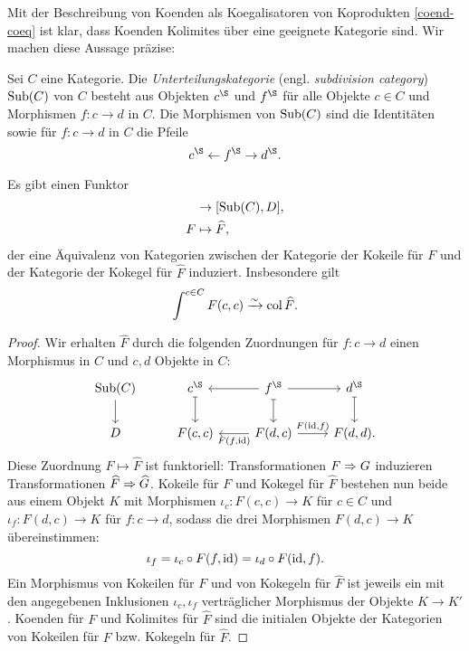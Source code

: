 Mit der Beschreibung von Koenden als Koegalisatoren von Koprodukten
\ref{coend-coeq} ist klar, dass Koenden Kolimites über eine geeignete
Kategorie sind. Wir machen diese Aussage präzise:
\begin{defn} \label{def:sub}
  Sei $C$ eine Kategorie. Die \emph{Unterteilungskategorie}
  (engl. \emph{subdivision category}) $\operatorname{Sub}(C)$ von $C$ besteht aus
  Objekten $c^\S$ und $f^\S$ für alle Objekte $c \in C$ und Morphismen
  $f: c \to d$ in $C$. Die Morphismen von $\operatorname{Sub}(C)$ sind die
  Identitäten sowie für $f: c \to d$ in $C$ die Pfeile
  \[ c^\S \from f^\S \to d^\S. \]
\end{defn}
\begin{prop} \label{coend-col}
  Es gibt einen Funktor
  \begin{align*}
    [C\op \times C, D] &\to [\Sub(C), D], \\
    F &\mapsto \widehat{F},
  \end{align*}
  der eine Äquivalenz von Kategorien zwischen der Kategorie der
  Kokeile für $F$ und der Kategorie der Kokegel für $\widehat{F}$
  induziert. Insbesondere gilt
  \[ \int^{c \in C} F(c, c) \xrightarrow[]{\sim} \operatorname{col} \widehat{F}. \]
\end{prop}
\begin{proof}
  Wir erhalten $\widehat{F}$ durch die folgenden Zuordnungen für $f: c \to
  d$ einen Morphismus in $C$ und $c, d$ Objekte in $C$:
  \[ \begin{tikzcd}
    \Sub(C) \arrow{d}
    & c^\S \arrow[mapsto]{d}
    & \arrow{l} f^\S \arrow[mapsto]{d} \arrow{r}
    & d^\S \arrow[mapsto]{d} \\
    D
    & F(c, c)
    & \arrow{l}{F(f, \id)} F(d, c) \arrow{r}{F(\id, f)}
    & F(d, d).
  \end{tikzcd} \]
  Diese Zuordnung $F \mapsto \widehat{F}$ ist funktoriell:
  Transformationen $F \Rightarrow G$ induzieren Transformationen
  $\widehat{F} \Rightarrow \widehat{G}$. Kokeile für $F$ und Kokegel für
  $\widehat{F}$ bestehen nun beide aus einem Objekt $K$ mit Morphismen
  $\iota_c: F(c, c) \to K$ für $c \in C$ und $\iota_f: F(d, c) \to K$
  für $f: c \to d$, sodass die drei Morphismen $F(d, c) \to K$
  übereinstimmen:
  \[ \iota_f = \iota_c \circ F(f, \operatorname{id}) = \iota_d \circ F(\operatorname{id}, f). \]
  Ein Morphismus von Kokeilen für $F$ und von Kokegeln für
  $\widehat{F}$ ist jeweils ein mit den angegebenen Inklusionen
  $\iota_c, \iota_f$ verträglicher Morphismus der Objekte $K \to
  K'$. Koenden für $F$ und Kolimites für $\widehat{F}$ sind die
  initialen Objekte der Kategorien von Kokeilen für $F$ bzw. Kokegeln
  für $\widehat{F}$.
\end{proof}
